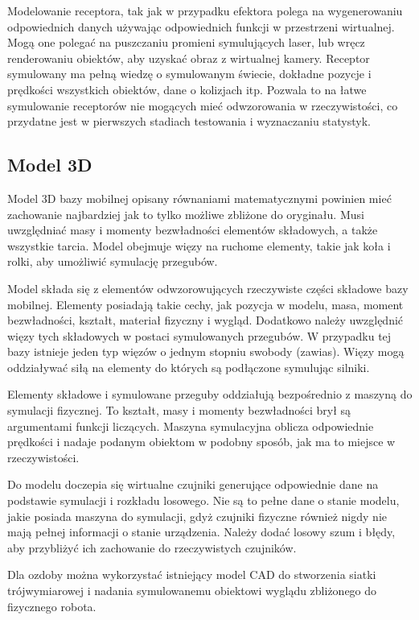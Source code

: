 Modelowanie receptora, tak jak w przypadku efektora polega na wygenerowaniu odpowiednich danych używając odpowiednich funkcji w przestrzeni wirtualnej.
Mogą one polegać na puszczaniu promieni symulujących laser, lub wręcz renderowaniu obiektów, aby uzyskać obraz z wirtualnej kamery.
Receptor symulowany ma pełną wiedzę o symulowanym świecie, dokładne pozycje i prędkości wszystkich obiektów, dane o kolizjach itp. 
Pozwala to na łatwe symulowanie receptorów nie mogących mieć odwzorowania w rzeczywistości, co przydatne jest w pierwszych stadiach testowania i wyznaczaniu statystyk.

\subsection{Model 3D}
Model 3D bazy mobilnej opisany równaniami matematycznymi powinien mieć zachowanie najbardziej jak to tylko możliwe zbliżone do oryginału.
Musi uwzględniać masy i momenty bezwładności elementów składowych, a także wszystkie tarcia.
Model obejmuje więzy na ruchome elementy, takie jak koła i rolki, aby umożliwić symulację przegubów.

Model składa się z elementów odwzorowujących rzeczywiste części składowe bazy mobilnej.
Elementy posiadają takie cechy, jak pozycja w modelu, masa, moment bezwładności, kształt, materiał fizyczny i wygląd.
Dodatkowo należy uwzględnić więzy tych składowych w postaci symulowanych przegubów.
W przypadku tej bazy istnieje jeden typ więzów o jednym stopniu swobody (zawias).
Więzy mogą oddziaływać siłą na elementy do których są podłączone symulując silniki.

Elementy składowe i symulowane przeguby oddziałują bezpośrednio z maszyną do symulacji fizycznej. 
To kształt, masy i momenty bezwładności brył są argumentami funkcji liczących.
Maszyna symulacyjna oblicza odpowiednie prędkości i nadaje podanym obiektom w podobny sposób, jak ma to miejsce w rzeczywistości.

Do modelu doczepia się wirtualne czujniki generujące odpowiednie dane na podstawie symulacji i rozkładu losowego.
Nie są to pełne dane o stanie modelu, jakie posiada maszyna do symulacji, gdyż czujniki fizyczne również nigdy nie mają pełnej informacji o stanie urządzenia.
Należy dodać losowy szum i błędy, aby przybliżyć ich zachowanie do rzeczywistych czujników.

Dla ozdoby można wykorzystać istniejący model CAD do stworzenia siatki trójwymiarowej i nadania symulowanemu obiektowi wyglądu zbliżonego do fizycznego robota.

